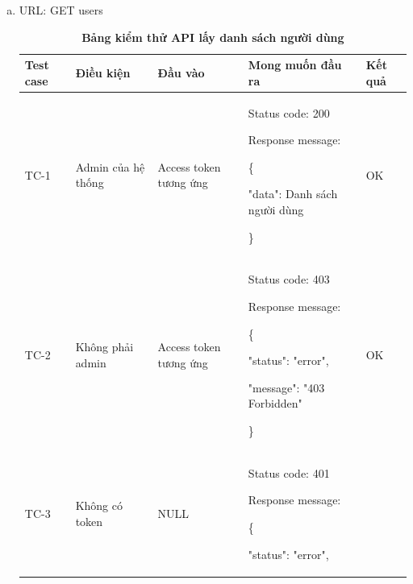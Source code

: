 \begin{enumerate}[a)]
	\item URL: GET users

	      \begin{xltabular}{\textwidth}{
		      | >{\raggedright\arraybackslash}p{1cm}
		      | >{\raggedright\arraybackslash}p{2.5cm}
		      | >{\raggedright\arraybackslash}p{3.5cm}
		      | >{\raggedright\arraybackslash}X
		      | >{\raggedright\arraybackslash}p{1cm}|
		      }
		      \caption{\bfseries \fontsize{12pt}{0pt}\selectfont Bảng kiểm thử API lấy danh sách người dùng}
		      \\
		      \hline
		      \bfseries Test case    &\bfseries Điều kiện   &\bfseries Đầu vào
		      &\bfseries Mong muốn đầu ra &\bfseries Kết quả\\ \hline


		      TC-1
		      & Admin của hệ thống
		      & Access token tương ứng

		      &

		      Status code: 200

		      Response message:

		      \{

		      "data": Danh sách người dùng

		      \}

		      & OK

		      \\ \hline

		      TC-2
		      & Không phải admin
		      & Access token tương ứng
		      &

		      Status code: 403

		      Response message:

		      \{

		      "status": "error",

		      "message": "403 Forbidden"

		      \}

		      & OK

		      \\ \hline


		      TC-3
		      & Không có token
		      & NULL

		      &

		      Status code: 401

		      Response message:

		      \{

		      "status": "error",


\end{xltabular}
\end{enumerate}

